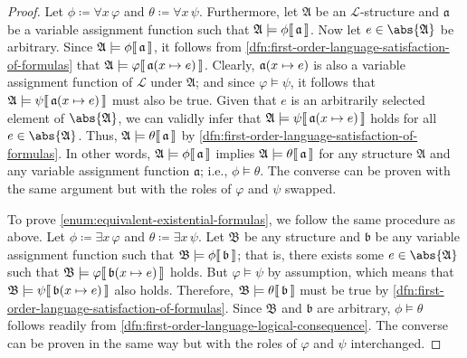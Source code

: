 \begin{proof}
    Let \( \phi \coloneq \forall x \, \varphi \) and \( \theta \coloneq \forall x \, \psi  \).
    Furthermore, let \( \mathfrak{A} \) be an \( \mathcal{L} \)-structure and \( \mathfrak{a} \) be a variable assignment function such that
    \(  \mathfrak{A} \models \phi\llbracket\, \mathfrak{a} \,\rrbracket \).
    Now let \( e \in \abs{\mathfrak{A}} \) be arbitrary.
    Since \(  \mathfrak{A} \models \phi\llbracket\, \mathfrak{a} \,\rrbracket \), it follows from \cref{dfn:first-order-language-satisfaction-of-formulas}
    that \( \folwffsatisfaction{\mathfrak{A}}{\varphi}{\folmodifiedvariableassignmentfunction{\mathfrak{a}}{x}{e}} \).
    Clearly, \( \folmodifiedvariableassignmentfunction{\mathfrak{a}}{x}{e} \) is also a variable assignment function of \( \mathcal{L} \)
    under \( \mathfrak{A} \); and since \( \varphi \models \psi \),
    it follows that \( \folwffsatisfaction{\mathfrak{A}}{\psi}{ \folmodifiedvariableassignmentfunction{\mathfrak{a}}{x}{e} } \) must also be true.
    Given that \( e \) is an arbitrarily selected element of \( \abs{\mathfrak{A}} \), we can validly infer that
    \( \folwffsatisfaction{\mathfrak{A}}{\psi}{ \folmodifiedvariableassignmentfunction{\mathfrak{a}}{x}{e} } \) holds for all \( e \in \abs{\mathfrak{A}} \).
    Thus, \(  \mathfrak{A} \models \theta\llbracket\, \mathfrak{a} \,\rrbracket \) by \cref{dfn:first-order-language-satisfaction-of-formulas}.
    In other words, \(  \mathfrak{A} \models \phi\llbracket\, \mathfrak{a} \,\rrbracket \) implies \(  \mathfrak{A} \models \theta\llbracket\, \mathfrak{a} \,\rrbracket \)
    for any structure \( \mathfrak{A} \) and any variable assignment function \( \mathfrak{a} \); i.e., \( \phi \models \theta \).
    The converse can be proven with the same argument but with the roles of \( \varphi \) and \( \psi \) swapped.

    \vspace{0.3cm}
    \noindent
    To prove \ref{enum:equivalent-existential-formulas}, we follow the same procedure as above.
    Let \( \phi \coloneq \exists x \, \varphi \) and \( \theta \coloneq \exists x \, \psi \).
    Let \( \mathfrak{B} \) be any structure and \( \mathfrak{b} \) be any variable assignment function
    such that \(  \mathfrak{B} \models \phi\llbracket\, \mathfrak{b} \,\rrbracket \); that is, there exists some
    \( e \in \abs{\mathfrak{A}} \) such that \( \folwffsatisfaction{\mathfrak{B}}{\varphi}{ \folmodifiedvariableassignmentfunction{\mathfrak{b}}{x}{e} } \) holds.
    But \( \varphi \models \psi \) by assumption, which means that
    \( \folwffsatisfaction{\mathfrak{B}}{\psi}{ \folmodifiedvariableassignmentfunction{\mathfrak{b}}{x}{e} } \) also holds.
    Therefore, \(  \mathfrak{B} \models \theta\llbracket\, \mathfrak{b} \,\rrbracket \) must be true by \cref{dfn:first-order-language-satisfaction-of-formulas}.
    Since \( \mathfrak{B} \) and \( \mathfrak{b} \) are arbitrary, \( \phi \models \theta \) follows readily from
    \cref{dfn:first-order-language-logical-consequence}.
    The converse can be proven in the same way but with the roles of \( \varphi \) and \( \psi \) interchanged.
\end{proof}

